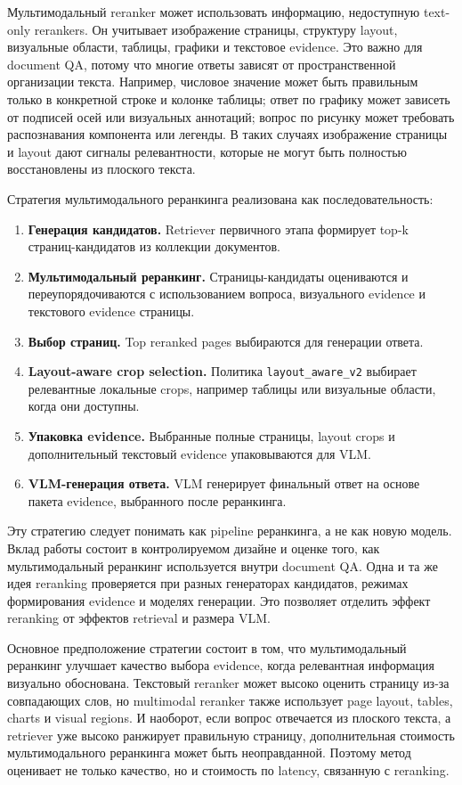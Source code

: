 \documentclass[conference]{IEEEtran}
\begin{document}
Мультимодальный reranker может использовать информацию, недоступную text-only rerankers. Он учитывает изображение страницы, структуру layout, визуальные области, таблицы, графики и текстовое evidence. Это важно для document QA, потому что многие ответы зависят от пространственной организации текста. Например, числовое значение может быть правильным только в конкретной строке и колонке таблицы; ответ по графику может зависеть от подписей осей или визуальных аннотаций; вопрос по рисунку может требовать распознавания компонента или легенды. В таких случаях изображение страницы и layout дают сигналы релевантности, которые не могут быть полностью восстановлены из плоского текста.

Стратегия мультимодального реранкинга реализована как последовательность:

\begin{enumerate}
\item \textbf{Генерация кандидатов.} Retriever первичного этапа формирует top-k страниц-кандидатов из коллекции документов.
\item \textbf{Мультимодальный реранкинг.} Страницы-кандидаты оцениваются и переупорядочиваются с использованием вопроса, визуального evidence и текстового evidence страницы.
\item \textbf{Выбор страниц.} Top reranked pages выбираются для генерации ответа.
\item \textbf{Layout-aware crop selection.} Политика \texttt{layout\_aware\_v2} выбирает релевантные локальные crops, например таблицы или визуальные области, когда они доступны.
\item \textbf{Упаковка evidence.} Выбранные полные страницы, layout crops и дополнительный текстовый evidence упаковываются для VLM.
\item \textbf{VLM-генерация ответа.} VLM генерирует финальный ответ на основе пакета evidence, выбранного после реранкинга.
\end{enumerate}

Эту стратегию следует понимать как pipeline реранкинга, а не как новую модель. Вклад работы состоит в контролируемом дизайне и оценке того, как мультимодальный реранкинг используется внутри document QA. Одна и та же идея reranking проверяется при разных генераторах кандидатов, режимах формирования evidence и моделях генерации. Это позволяет отделить эффект reranking от эффектов retrieval и размера VLM.

Основное предположение стратегии состоит в том, что мультимодальный реранкинг улучшает качество выбора evidence, когда релевантная информация визуально обоснована. Текстовый reranker может высоко оценить страницу из-за совпадающих слов, но multimodal reranker также использует page layout, tables, charts и visual regions. И наоборот, если вопрос отвечается из плоского текста, а retriever уже высоко ранжирует правильную страницу, дополнительная стоимость мультимодального реранкинга может быть неоправданной. Поэтому метод оценивает не только качество, но и стоимость по latency, связанную с reranking.
\end{document}
